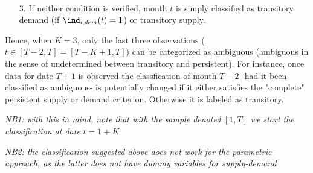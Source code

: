 \begin{itemize}
\begin{align*}
    \end{align*}
    \item[3.] If neither condition is verified, month $t$ is simply classified as transitory demand (if $\ind_{i,dem}(t)=1$) or transitory supply.
\end{itemize}

Hence, when $K=3$, only the last three observations ($t\in[T-2,T]=[T-K+1,T]$) can be categorized as ambiguous (ambiguous in the sense of undetermined between transitory and persistent). 
For instance, once data for date $T+1$ is observed the classfication of month $T-2$ -had it been classified as ambiguous- is potentially changed if it either satisfies the "complete" persistent supply or demand criterion. 
Otherwise it is labeled as transitory.

\textit{NB1: with this in mind, note that with the sample denoted }$[1,T]$\textit{ we start the classification at date }$t=1+K$

\textit{NB2: the classification suggested above does not work for the parametric approach, as the latter does not have dummy variables for supply-demand}


\clearpage